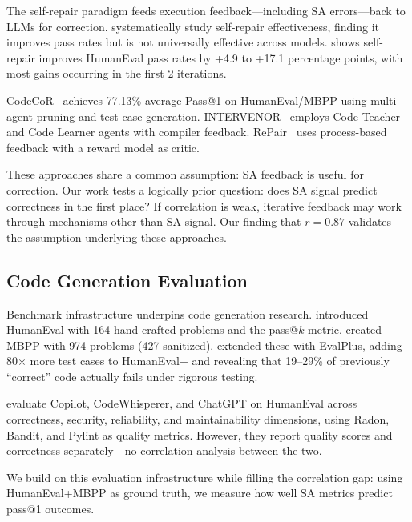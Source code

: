 The self-repair paradigm feeds execution feedback---including SA errors---back to LLMs for correction. \citet{Olausson2024SelfRepair} systematically study self-repair effectiveness, finding it improves pass rates but is not universally effective across models. \citet{Arimbur2026Tries} shows self-repair improves HumanEval pass rates by +4.9 to +17.1 percentage points, with most gains occurring in the first 2 iterations.

CodeCoR~\citep{Pan2025CodeCoR} achieves 77.13\% average Pass@1 on HumanEval/MBPP using multi-agent pruning and test case generation. INTERVENOR~\citep{NEUIR2024INTERVENOR} employs Code Teacher and Code Learner agents with compiler feedback. RePair~\citep{TnTWoW2024RePair} uses process-based feedback with a reward model as critic.

These approaches share a common assumption: SA feedback is useful for correction. Our work tests a logically prior question: does SA signal predict correctness in the first place? If correlation is weak, iterative feedback may work through mechanisms other than SA signal. Our finding that $r=0.87$ validates the assumption underlying these approaches.

\subsection{Code Generation Evaluation}

Benchmark infrastructure underpins code generation research. \citet{Chen2021Evaluating} introduced HumanEval with 164 hand-crafted problems and the pass@$k$ metric. \citet{Austin2021Program} created MBPP with 974 problems (427 sanitized). \citet{Liu2023EvalPlus} extended these with EvalPlus, adding 80$\times$ more test cases to HumanEval+ and revealing that 19--29\% of previously ``correct'' code actually fails under rigorous testing.

\citet{Yetistiren2023Evaluating} evaluate Copilot, CodeWhisperer, and ChatGPT on HumanEval across correctness, security, reliability, and maintainability dimensions, using Radon, Bandit, and Pylint as quality metrics. However, they report quality scores and correctness separately---no correlation analysis between the two.

We build on this evaluation infrastructure while filling the correlation gap: using HumanEval+MBPP as ground truth, we measure how well SA metrics predict pass@1 outcomes.

